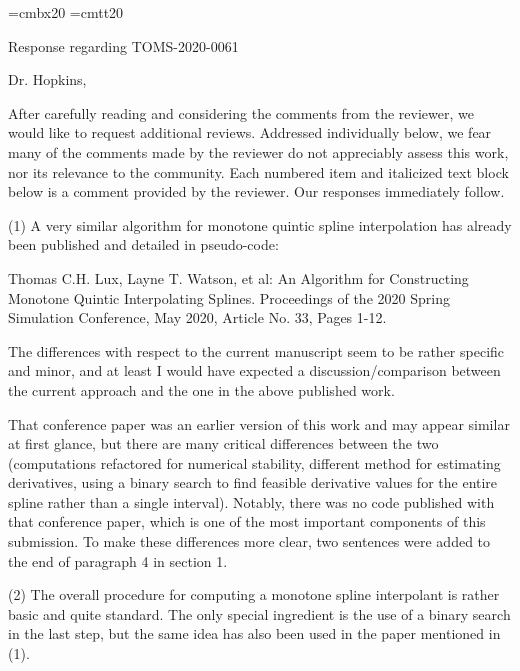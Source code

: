 
\parindent=0pt
\parskip=9pt

\font\titlebf=cmbx20
\font\titlett=cmtt20

{\titlebf Response regarding {\titlett TOMS-2020-0061} \bigskip}

Dr. Hopkins,

After carefully reading and considering the comments from the reviewer, we would like to request additional reviews. Addressed individually below, we fear many of the comments made by the reviewer do not appreciably assess this work, nor its relevance to the community. Each numbered item and italicized text block below is a comment provided by the reviewer. Our responses immediately follow.

{\parindent=20pt \it

\item{(1)} A very similar algorithm for monotone quintic spline interpolation has already been published and detailed in pseudo-code:

\itemitem{} Thomas C.H. Lux, Layne T. Watson, et al: An Algorithm for Constructing Monotone Quintic Interpolating Splines. Proceedings of the 2020 Spring Simulation Conference, May 2020, Article No. 33, Pages 1-12.

\item{} The differences with respect to the current manuscript seem to be rather specific and minor, and at least I would have expected a discussion/comparison between the current approach and the one in the above published work.

}

That conference paper was an earlier version of this work and may appear similar at first glance, but there are many critical differences between the two (computations refactored for numerical stability, different method for estimating derivatives, using a binary search to find feasible derivative values for the entire spline rather than a single interval). Notably, there was no code published with that conference paper, which is one of the most important components of this submission. To make these differences more clear, two sentences were added to the end of paragraph 4 in section 1.

{\parindent=20pt \it

\item{(2)} The overall procedure for computing a monotone spline interpolant is rather basic and quite standard. The only special ingredient is the use of a binary search in the last step, but the same idea has also been used in the paper mentioned in (1).

}

